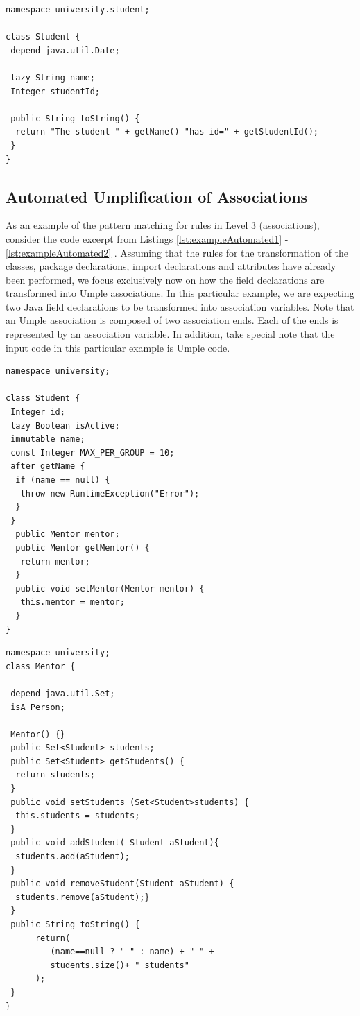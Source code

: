 \begin{lstlisting}[style=umpleOut, label=lst:level2exampleGenerator, caption=Umple code generated -- Level 2]
namespace university.student;

class Student {
 depend java.util.Date;
	
 lazy String name;
 Integer studentId;
       
 public String toString() {
  return "The student " + getName() "has id=" + getStudentId();
 }
}   
\end{lstlisting}

\subsection{Automated Umplification of Associations}

As an example of the pattern matching for rules in Level 3 (associations), consider the code excerpt from Listings \ref{lst:exampleAutomated1} - \ref{lst:exampleAutomated2} . Assuming that the rules for the transformation of the classes, package declarations, import declarations and attributes have already been performed, we focus exclusively now on how the field declarations are transformed into Umple associations. In this particular example, we are expecting two Java field declarations to be transformed into association variables. Note that an Umple association is composed of two association ends. Each of the ends is represented by an association variable. In addition, take special note that the input code in this particular example is Umple code.

\begin{lstlisting}[style=UmpleIn,caption=Student.ump,label=lst:exampleAutomated1]
namespace university;

class Student { 
 Integer id; 
 lazy Boolean isActive; 
 immutable name; 
 const Integer MAX_PER_GROUP = 10; 
 after getName {
  if (name == null) { 
   throw new RuntimeException("Error");
  }
 }
  public Mentor mentor; 
  public Mentor getMentor() { 
   return mentor; 
  }
  public void setMentor(Mentor mentor) { 
   this.mentor = mentor; 
  } 
}
\end{lstlisting}

\begin{lstlisting}[style=UmpleIn,caption=Mentor.ump,label=lst:exampleAutomated2]
namespace university;
class Mentor { 

 depend java.util.Set;
 isA Person;
 
 Mentor() {}
 public Set<Student> students;
 public Set<Student> getStudents() {
  return students; 
 } 
 public void setStudents (Set<Student>students) { 
  this.students = students;
 } 
 public void addStudent( Student aStudent){
  students.add(aStudent); 
 }
 public void removeStudent(Student aStudent) {
  students.remove(aStudent);} 
 } 
 public String toString() {
      return(
         (name==null ? " " : name) + " " +
         students.size()+ " students"
      );
 }
}
\end{lstlisting}

